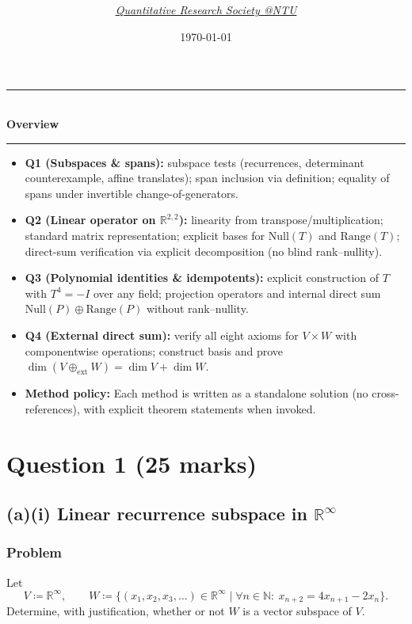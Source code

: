 \documentclass[12pt]{article}
\title{
\Huge \CourseCode\ \CourseName \\[0.3em]
\Large \DocType  \\[0.3em]
\ExamMeta
}
\author{
  \textit{\href{https://qrsntu.org}{Quantitative Research Society @NTU}}
}
\date{\today}
\newcommand{\R}{\mathbb{R}}
\newcommand{\N}{\mathbb{N}}
\newenvironment{overview}{
  \par\bigskip
  \begin{center}
    \rule{0.92\linewidth}{0.6pt}\\[-0.2em]
    \textbf{Overview}\\[-0.2em]
    \rule{0.92\linewidth}{0.6pt}
  \end{center}
  \vspace{-0.3em}
  \begin{itemize}[leftmargin=1.6em, itemsep=0.2em, topsep=0.2em]
}{
  \end{itemize}
  \par\bigskip
}
\begin{document}
\maketitle
\thispagestyle{plainfirst}
\pagestyle{main}

\begin{overview}
  \item \textbf{Q1 (Subspaces \& spans):} subspace tests (recurrences, determinant counterexample, affine translates); span inclusion via definition; equality of spans under invertible change-of-generators.
  \item \textbf{Q2 (Linear operator on $\R^{2,2}$):} linearity from transpose/multiplication; standard matrix representation; explicit bases for $\mathrm{Null}(T)$ and $\mathrm{Range}(T)$; direct-sum verification via explicit decomposition (no blind rank--nullity).
  \item \textbf{Q3 (Polynomial identities \& idempotents):} explicit construction of $T$ with $T^4=-I$ over any field; projection operators and internal direct sum $\mathrm{Null}(P)\oplus\mathrm{Range}(P)$ without rank--nullity.
  \item \textbf{Q4 (External direct sum):} verify all eight axioms for $V\times W$ with componentwise operations; construct basis and prove $\dim(V\oplus_{\mathrm{ext}}W)=\dim V+\dim W$.
  \item \textbf{Method policy:} Each method is written as a standalone solution (no cross-references), with explicit theorem statements when invoked.
\end{overview}

\newpage



\tableofcontents
\newpage

\section{Question 1 \hfill (25 marks)}

\subsection{(a)(i) Linear recurrence subspace in \(\R^\infty\)}
\subsubsection{Problem}
Let
\[
V \coloneqq \R^\infty,\qquad
W \coloneqq \{(x_1,x_2,x_3,\ldots)\in \R^\infty \mid \forall n\in \N:\ x_{n+2}=4x_{n+1}-2x_n\}.
\]
Determine, with justification, whether or not \(W\) is a vector subspace of \(V\).
\end{document}
